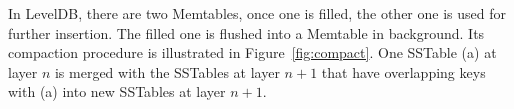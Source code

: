 In LevelDB, there are two Memtables, once one is filled, the other one
is used for further insertion. The filled one is flushed into a
Memtable in background. Its compaction procedure is illustrated in
Figure~\ref{fig:compact}. One SSTable (a) at layer $n$ is merged with
the SSTables at layer $n+1$ that have overlapping keys with (a) into
new SSTables at layer $n+1$.




















